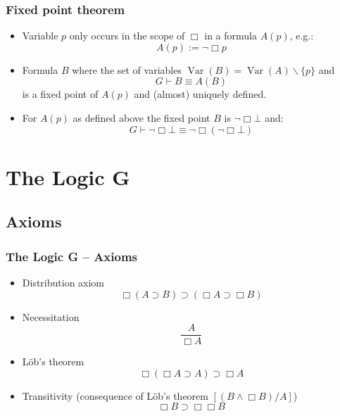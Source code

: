 \documentclass{beamer}
\DeclareMathOperator*{\Var}{Var}
\begin{document}
\begin{frame}
\frametitle{Fixed point theorem\cite{sep-prove}}
\begin{itemize}
\item<+->Variable $p$ only occurs in the scope of $\Box$ in a formula $A(p)$, e.g.:
\begin{equation*}
A(p) := \lnot \Box p
\end{equation*}
\item<+->Formula $B$ where the set of variables $\Var(B) = \Var(A)\smallsetminus\{p\}$ and 
\begin{equation*}
G \vdash B \equiv A(B)
\end{equation*}
is a fixed point of $A(p)$ and (almost) uniquely defined.
\item<+-> For $A(p)$ as defined above the fixed point $B$ is $\lnot \Box \bot$ and:
\begin{equation*}
G\vdash \lnot \Box\bot \equiv  \lnot\Box ( \lnot \Box\bot)
\end{equation*}
\end{itemize}

\end{frame}


\section{The Logic G}
\subsection{Axioms}
\begin{frame}\frametitle{The Logic G -- Axioms}
\begin{itemize}
\item<1-> Distribution axiom
\begin{equation*}
\Box(A\supset B) \supset (\Box A \supset \Box B)
\end{equation*}
\item<1-> Necessitation
\begin{equation*}
\frac{A}{\Box A}
\end{equation*}
\item<2-> Löb's theorem
\begin{equation*}
\Box(\Box A \supset A) \supset \Box A 
\end{equation*}
\item<3-> Transitivity (consequence of Löb's theorem $\left[(B\land \Box B) / A \right]$)
\begin{equation*}
\Box B \supset \Box \Box B
\end{equation*}
\end{itemize}
\end{frame}
\end{document}
